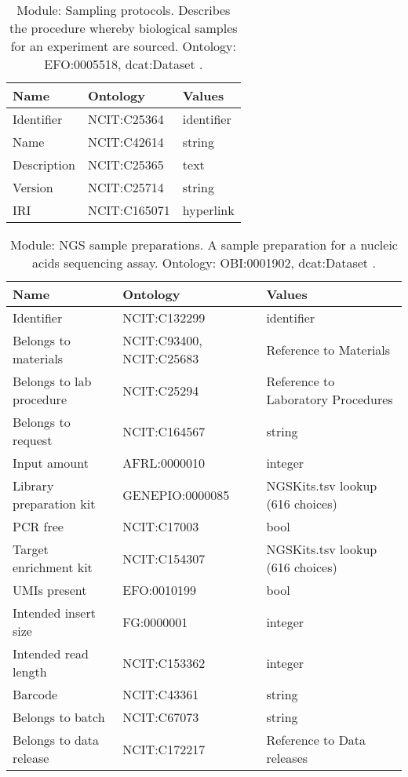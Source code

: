\documentclass{article}
\begin{document}
\begin{table}[htb]
\begin{tabular}{lll}
Name & Ontology & Values \\
\hline
Identifier & NCIT:C25364  & identifier \\
Name & NCIT:C42614  & string \\
Description & NCIT:C25365  & text \\
Version & NCIT:C25714  & string \\
IRI & NCIT:C165071  & hyperlink \\
\hline
\end{tabular}
\caption[Module: Sampling protocols]{\label{table:table7} Module: Sampling protocols. Describes the procedure whereby biological samples for an experiment are sourced. Ontology: EFO:0005518, dcat:Dataset . }
\end{table}

\begin{table}[htb]
\begin{tabular}{lll}
Name & Ontology & Values \\
\hline
Identifier & NCIT:C132299  & identifier \\
Belongs to materials & NCIT:C93400, NCIT:C25683  & Reference to Materials \\
Belongs to lab procedure & NCIT:C25294  & Reference to Laboratory Procedures \\
Belongs to request & NCIT:C164567  & string \\
Input amount & AFRL:0000010  & integer \\
Library preparation kit & GENEPIO:0000085  & NGSKits.tsv lookup (616 choices) \\
PCR free & NCIT:C17003  & bool \\
Target enrichment kit & NCIT:C154307  & NGSKits.tsv lookup (616 choices) \\
UMIs present & EFO:0010199  & bool \\
Intended insert size & FG:0000001  & integer \\
Intended read length & NCIT:C153362  & integer \\
Barcode & NCIT:C43361  & string \\
Belongs to batch & NCIT:C67073  & string \\
Belongs to data release & NCIT:C172217  & Reference to Data releases \\
\hline
\end{tabular}
\caption[Module: NGS sample preparations]{\label{table:table8} Module: NGS sample preparations. A sample preparation for a nucleic acids sequencing assay. Ontology: OBI:0001902, dcat:Dataset . }
\end{table}
\end{document}
